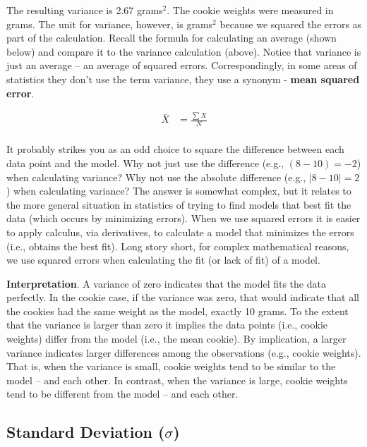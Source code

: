 \documentclass[
]{krantz}
\begin{document}
The resulting variance is 2.67 grams\(^2\). The cookie weights were measured in grams. The unit for variance, however, is grams\(^2\) because we squared the errors as part of the calculation. Recall the formula for calculating an average (shown below) and compare it to the variance calculation (above). Notice that variance is just an average -- an average of squared errors. Correspondingly, in some areas of statistics they don't use the term variance, they use a synonym - \textbf{mean squared error}.

\[
\begin{aligned} 
\bar{X} &= \frac{\sum{X}}{N} \\
\end{aligned} 
\]

It probably strikes you as an odd choice to square the difference between each data point and the model. Why not just use the difference (e.g., \((8 - 10) = -2\)) when calculating variance? Why not use the absolute difference (e.g., \(|8 - 10|= 2\)) when calculating variance? The answer is somewhat complex, but it relates to the more general situation in statistics of trying to find models that best fit the data (which occurs by minimizing errors). When we use squared errors it is easier to apply calculus, via derivatives, to calculate a model that minimizes the errors (i.e., obtains the best fit). Long story short, for complex mathematical reasons, we use squared errors when calculating the fit (or lack of fit) of a model.

\textbf{Interpretation}. A variance of zero indicates that the model fits the data perfectly. In the cookie case, if the variance was zero, that would indicate that all the cookies had the same weight as the model, exactly 10 grams. To the extent that the variance is larger than zero it implies the data points (i.e., cookie weights) differ from the model (i.e., the mean cookie). By implication, a larger variance indicates larger differences among the observations (e.g., cookie weights). That is, when the variance is small, cookie weights tend to be similar to the model -- and each other. In contrast, when the variance is large, cookie weights tend to be different from the model -- and each other.

\hypertarget{standard-deviation-sigma}{%
\subsection{\texorpdfstring{Standard Deviation (\(\sigma\))}{Standard Deviation (\textbackslash sigma)}}\label{standard-deviation-sigma}}
\end{document}
